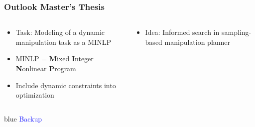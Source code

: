 \documentclass[12pt, %
			  t     %
]{beamer}%
\begin{document}
\begin{frame}
\frametitle{Outlook Master's Thesis}
\begin{columns}[T]
\begin{column}{.55\textwidth}
\small
\begin{itemize}
\item Task: Modeling of a dynamic manipulation task as a MINLP
\item MINLP = \textbf{M}ixed \textbf{I}nteger \textbf{N}onlinear \textbf{P}rogram
\item Include dynamic constraints into optimization
\end{itemize}
\end{column}

\begin{column}{.45\textwidth}
\small
\begin{itemize}
\item Idea: Informed search in sampling-based manipulation planner
\end{itemize}
\end{column}
\end{columns}
\end{frame}


\begin{frame}
\centering
\begin{beamercolorbox}[wd=\paperwidth,ht=5cm,dp=1ex,center]{blue}%
 \textcolor{blue}{Backup}%
\end{beamercolorbox}
\end{frame}

\end{document}
